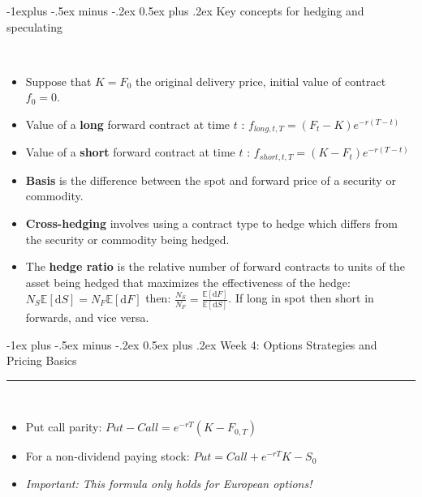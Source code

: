 \documentclass[10pt,landscape,a4paper]{article}
\makeatletter
\renewcommand{\section}{\@startsection{section}{1}{0mm}%
                                {-1ex plus -.5ex minus -.2ex}%
                                {0.5ex plus .2ex}%
                                {\normalfont\large\bfseries}}
\renewcommand{\subsection}{\@startsection{subsection}{2}{0mm}%
                                {-1explus -.5ex minus -.2ex}%
                                {0.5ex plus .2ex}%
                                {\normalfont\normalsize\bfseries}}
\makeatother
\begin{document}
\begin{multicols*}{3}
\subsection{Key concepts for hedging and speculating}
  \begin{description}[topsep=0pt]
	\item[Valuing a forward contract over time] ~
	\begin{itemize}[topsep=0pt]
		\item Suppose that $K=F_0$ the original delivery price, initial value of contract $f_0=0$.
		\item Value of a \textbf{long} forward contract at time $t$ :  $f_{long,t,T} = (F_t-K) e ^{-r(T-t)}$ 
		\item Value of a \textbf{short} forward contract at time $t$ :  $f_{short,t,T} = (K-F_t) e ^{-r(T-t)}$ 
		\item \textbf{Basis} is the difference between the spot and forward price
		of a security or commodity.
		\item \textbf{Cross-hedging} involves using a contract type to hedge
		which differs from the security or commodity being hedged.
		\item The \textbf{hedge ratio} is the relative number of forward contracts to units
		of the asset being hedged that maximizes the effectiveness of the hedge:  $N_S \mathbb{E}[\text{d}S] = N_F \mathbb{E}[\text{d}F] $ then: $\frac{N_S}{N_F} = \frac{\mathbb{E}[\text{d}F]}{\mathbb{E}[\text{d}S]}$. If long in spot then short in forwards, and vice versa.
	\end{itemize}
\end{description}

\section{Week 4: Options Strategies and Pricing Basics}\smallskip \hrule height 1pt \smallskip
 
 
 \begin{description}[topsep=0pt]
 	\item[Option Basics] ~
 	\begin{itemize}[topsep=0pt]
 		\item Put call parity: $Put-Call=e^{-rT}(K-F_{0,T})$ 
 		\item For a non-dividend paying stock: $Put = Call + e^{-rT}K-S_0$
 		\item \textit{Important: This formula only holds for European options!}
 	\end{itemize}
 \end{description}
 

\end{multicols*}
\end{document}
